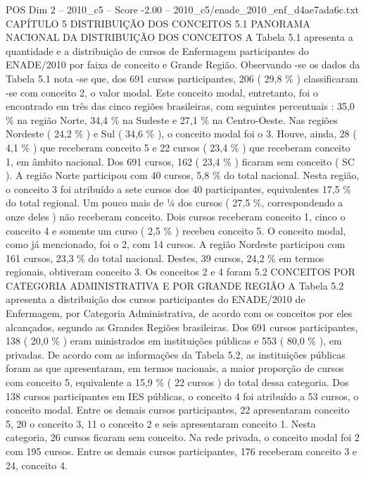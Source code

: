 \begin{textsample}{POS Dim 2 – 2010\_c5 – Score -2.00 – 2010\_c5/enade\_2010\_enf\_d4ae7ada6c.txt}  \label{ex:f2_pos_331}
CAPÍTULO 5 DISTRIBUIÇÃO DOS CONCEITOS 5.1 PANORAMA NACIONAL DA DISTRIBUIÇÃO DOS CONCEITOS A Tabela 5.1 apresenta a quantidade e a distribuição de cursos de Enfermagem participantes do ENADE/2010 por faixa de conceito e Grande Região.
Observando -se os dados da Tabela 5.1 nota -se que, dos 691 cursos participantes, 206 ( 29,8 \% ) classificaram -se com conceito 2, o valor modal.
Este conceito modal, entretanto, foi o encontrado em três das cinco regiões brasileiras, com seguintes percentuais : 35,0 \% na região Norte, 34,4 \% na Sudeste e 27,1 \% na Centro-Oeste.
Nas regiões Nordeste ( 24,2 \% ) e Sul ( 34,6 \% ), o conceito modal foi o 3.
Houve, ainda, 28 ( 4,1 \% ) que receberam conceito 5 e 22 cursos ( 23,4 \% ) que receberam conceito 1, em âmbito nacional.
Dos 691 cursos, 162 ( 23,4 \% ) ficaram sem conceito ( SC ).
A região Norte participou com 40 cursos, 5,8 \% do total nacional.
Nesta região, o conceito 3 foi atribuído a sete cursos dos 40 participantes, equivalentes 17,5 \% do total regional.
Um pouco mais de ¼ dos cursos ( 27,5 \%, correspondendo a onze deles ) não receberam conceito.
Dois cursos receberam conceito 1, cinco o conceito 4 e somente um curso ( 2,5 \% ) recebeu conceito 5.
O conceito modal, como já mencionado, foi o 2, com 14 cursos.
A região Nordeste participou com 161 cursos, 23,3 \% do total nacional.
Destes, 39 cursos, 24,2 \% em termos regionais, obtiveram conceito 3.
Os conceitos 2 e 4 foram 5.2 CONCEITOS POR CATEGORIA ADMINISTRATIVA E POR GRANDE REGIÃO A Tabela 5.2 apresenta a distribuição dos cursos participantes do ENADE/2010 de Enfermagem, por Categoria Administrativa, de acordo com os conceitos por eles alcançados, segundo as Grandes Regiões brasileiras.
Dos 691 cursos participantes, 138 ( 20,0 \% ) eram ministrados em instituições públicas e 553 ( 80,0 \% ), em privadas.
De acordo com as informações da Tabela 5.2, as instituições públicas foram as que apresentaram, em termos nacionais, a maior proporção de cursos com conceito 5, equivalente a 15,9 \% ( 22 cursos ) do total dessa categoria.
Dos 138 cursos participantes em IES públicas, o conceito 4 foi atribuído a 53 cursos, o conceito modal.
Entre os demais cursos participantes, 22 apresentaram conceito 5, 20 o conceito 3, 11 o conceito 2 e seis apresentaram conceito 1.
Nesta categoria, 26 cursos ficaram sem conceito.
Na rede privada, o conceito modal foi 2 com 195 cursos.
Entre os demais cursos participantes, 176 receberam conceito 3 e 24, conceito 4.

\end{textsample}
